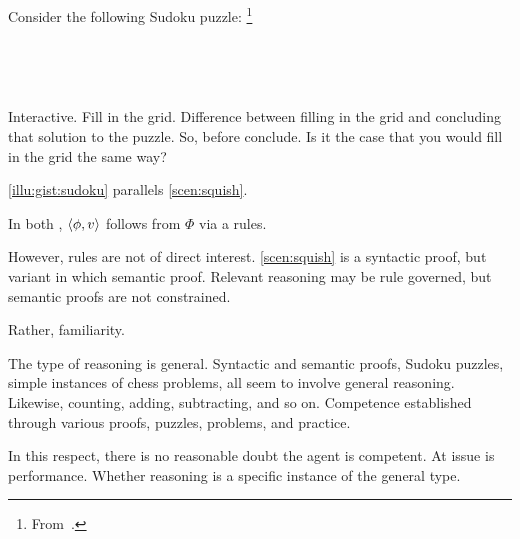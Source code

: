 \begin{note}
  \begin{illustration}[Sudoku]
    \label{illu:gist:sudoku}
    Consider the following Sudoku puzzle:%
    \footnote{
      From~\textcite[84]{Coussement:2007up}.
    }
    \vspace{\baselineskip}

    \mbox{ }\hfill%
    \begin{adjustbox}{minipage=0.45\linewidth,scale=1}
      \centering
    \end{adjustbox}%
    \hfill\mbox{ }

  \end{illustration}

  Interactive.
  Fill in the grid.
  Difference between filling in the grid and concluding that solution to the puzzle.
  So, before conclude.
  Is it the case that you would fill in the grid the same way?
\end{note}

\begin{note}
  \autoref{illu:gist:sudoku} parallels \autoref{scen:squish}.

  In both , \(\langle \phi, v \rangle\) follows from \(\Phi\) via a rules.

  However, rules are not of direct interest.
  \autoref{scen:squish} is a syntactic proof, but variant  in which semantic proof.
  Relevant reasoning may be rule governed, but semantic proofs are not constrained.

  Rather, familiarity.

  The type of reasoning is general.
  Syntactic and semantic proofs, Sudoku puzzles, simple instances of chess problems, all seem to involve general reasoning.
  Likewise, counting, adding, subtracting, and so on.
  Competence established through various proofs, puzzles, problems, and practice.

  In this respect, there is no reasonable doubt the agent is competent.
  At issue is performance.
  Whether reasoning is a specific instance of the general type.
\end{note}

